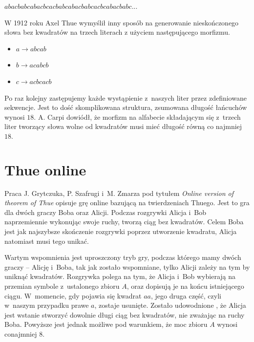\documentclass[document]{xmgr}
\begin{document}
{\centering $abacbabcabacbcacbabcabacbabcacbcabacbabc...$ \par}

W 1912 roku Axel Thue wymyślił inny sposób na generowanie nieskończonego słowa bez kwadratów na trzech literach z użyciem następującego morfizmu. 
\begin{itemize}
\item $a \to abcab$
\item $b \to acabcb$
\item $c \to acbcacb$
\end{itemize}


Po raz kolejny zastępujemy każde wystąpienie z~naszych liter przez zdefiniowane sekwencje. Jest to dość skomplikowana struktura, zsumowana długość łańcuchów wynosi $18$. A. Carpi \cite{carpi} dowiódł, że morfizm na alfabecie składającym się z~trzech liter tworzący słowa wolne od kwadratów musi mieć długość równą co najmniej $18$.

\section{Thue online}
Praca J. Grytczuka, P. Szafrugi i~M. Zmarza pod tytułem \emph{Online version of theorem of Thue} \cite{thueonline} opisuje grę online bazującą na twierdzeniach Thuego. Jest to gra dla dwóch graczy Boba oraz Alicji. Podczas rozgrywki Alicja i~Bob naprzemiennie wykonując swoje ruchy, tworzą ciąg bez kwadratów. Celem Boba jest jak najszybsze skończenie rozgrywki poprzez utworzenie kwadratu, Alicja natomiast musi tego unikać.

Wartym wspomnienia jest uproszczony tryb gry, podczas którego mamy dwóch graczy -- Alicję i~Boba, tak jak zostało wspomniane, tylko Alicji zależy na tym by uniknąć kwadratów. Rozgrywka polega na tym, że Alicja i~Bob wybierają na przemian symbole z~ustalonego zbioru $A$, oraz dopisują je na końcu istniejącego ciągu. W~momencie, gdy pojawia się kwadrat $aa$, jego druga część, czyli w~naszym przypadku prawe $a$, zostaje usunięte. Zostało udowodnione \cite{thueonline2}, że Alicja jest wstanie stworzyć dowolnie długi ciąg bez kwadratów, nie zważając na ruchy Boba. Powyższe jest jednak możliwe pod warunkiem, że moc zbioru $A$ wynosi conajmniej 8.
\end{document}
